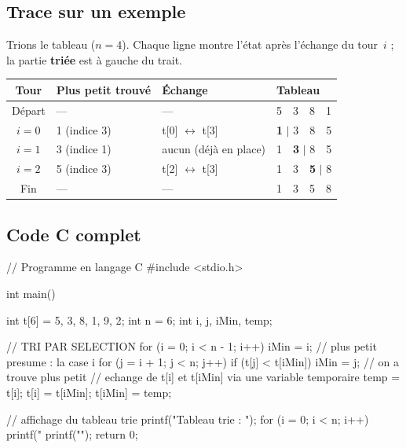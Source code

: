 \subsection{Trace sur un exemple}

Trions le tableau \code{[5, 3, 8, 1]} ($n = 4$). Chaque ligne montre l'état après
l'échange du tour~$i$ ; la partie \textbf{triée} est à gauche du trait.

\begin{center}\small
\begin{tabular}{@{}clll@{}}
\toprule
\textbf{Tour} & \textbf{Plus petit trouvé} & \textbf{Échange} & \textbf{Tableau}\\
\midrule
Départ & --- & --- & 5\ \ 3\ \ 8\ \ 1\\
$i=0$ & 1 (indice 3) & t[0] $\leftrightarrow$ t[3] & \textbf{1} $|$ 3\ \ 8\ \ 5\\
$i=1$ & 3 (indice 1) & aucun (déjà en place) & 1\ \ \textbf{3} $|$ 8\ \ 5\\
$i=2$ & 5 (indice 3) & t[2] $\leftrightarrow$ t[3] & 1\ \ 3\ \ \textbf{5} $|$ 8\\
Fin & --- & --- & 1\ \ 3\ \ 5\ \ 8\\
\bottomrule
\end{tabular}
\end{center}


\subsection{Code C complet}

\begin{codec}
// Programme en langage C
#include <stdio.h>

int main() {
    int t[6] = {5, 3, 8, 1, 9, 2};
    int n = 6;
    int i, j, iMin, temp;

    // TRI PAR SELECTION
    for (i = 0; i < n - 1; i++) {
        iMin = i;                       // plus petit presume : la case i
        for (j = i + 1; j < n; j++) {
            if (t[j] < t[iMin]) {
                iMin = j;               // on a trouve plus petit
            }
        }
        // echange de t[i] et t[iMin] via une variable temporaire
        temp = t[i];
        t[i] = t[iMin];
        t[iMin] = temp;
    }

    // affichage du tableau trie
    printf("Tableau trie : ");
    for (i = 0; i < n; i++) {
        printf("%
    }
    printf("\n");
    return 0;
}
\end{codec}

